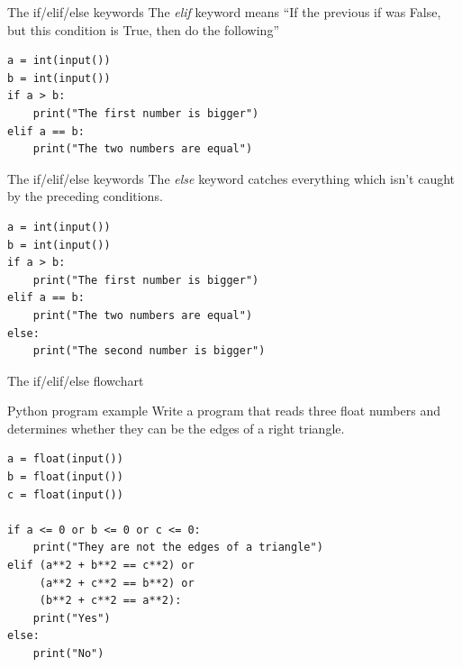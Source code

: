 \documentclass[aspectratio=169,]{beamer}
\begin{document}
\begin{frame}[fragile]{The if/elif/else keywords}
    The \emph{elif} keyword means ``If the previous if was False, but this condition is True, then do the following''
    \begin{verbatim}
a = int(input())
b = int(input())
if a > b:
    print("The first number is bigger")
elif a == b:
    print("The two numbers are equal")
    \end{verbatim}
\end{frame}

\begin{frame}[fragile]{The if/elif/else keywords}
    The \emph{else} keyword catches everything which isn't caught by the preceding conditions.
    \begin{verbatim}
a = int(input())
b = int(input())
if a > b:
    print("The first number is bigger")
elif a == b:
    print("The two numbers are equal")
else:
    print("The second number is bigger")
    \end{verbatim}
\end{frame}

\begin{frame}{The if/elif/else flowchart}
\end{frame}

\begin{frame}[fragile]{Python program example}
    Write a program that reads three float numbers and determines whether they can be the edges of a right triangle.
    \pause

    \begin{verbatim}
a = float(input())
b = float(input())
c = float(input())

if a <= 0 or b <= 0 or c <= 0:
    print("They are not the edges of a triangle")
elif (a**2 + b**2 == c**2) or
     (a**2 + c**2 == b**2) or
     (b**2 + c**2 == a**2):
    print("Yes")
else:
    print("No")
    \end{verbatim}
\end{frame}
\end{document}
